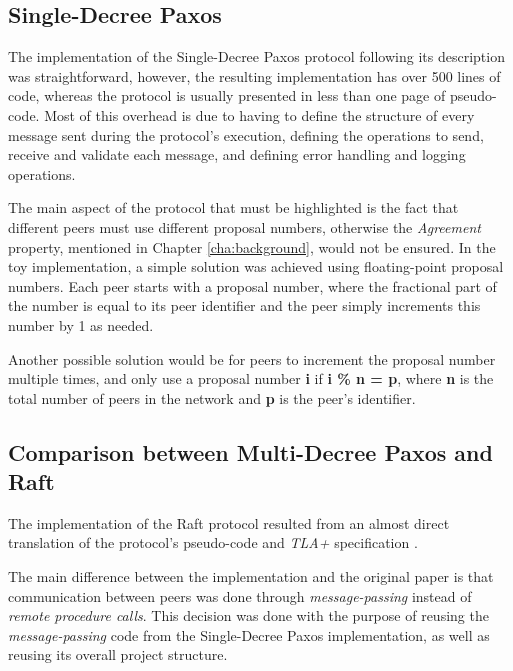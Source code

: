 \subsection{Single-Decree Paxos}

The implementation of the Single-Decree Paxos protocol following its description \cite{paxos_made_simple} was straightforward, however, the resulting implementation has over 500 lines of code, whereas the protocol is usually presented in less than one page of pseudo-code. Most of this overhead is due to having to define the structure of every message sent during the protocol's execution, defining the operations to send, receive and validate each message, and defining error handling and logging operations.

\vspace{0.2cm}

The main aspect of the protocol that must be highlighted is the fact that different peers must use different proposal numbers, otherwise the \textit{Agreement} property, mentioned in Chapter \ref{cha:background}, would not be ensured. In the toy implementation, a simple solution was achieved using floating-point proposal numbers. Each peer starts with a proposal number, where the fractional part of the number is equal to its peer identifier and the peer simply increments this number by 1 as needed.

Another possible solution would be for peers to increment the proposal number multiple times, and only use a proposal number \textbf{i} if \textbf{i \% n = p}, where \textbf{n} is the total number of peers in the network and \textbf{p} is the peer's identifier. 




\subsection{Comparison between Multi-Decree Paxos and Raft}

The implementation of the Raft protocol resulted from an almost direct translation of the protocol's pseudo-code \cite{raft} and \textit{TLA+} specification \cite{raft_tla}.

The main difference between the implementation and the original paper \cite{raft} is that communication between peers was done through \textit{message-passing} instead of \textit{remote procedure calls}. This decision was done with the purpose of reusing the \textit{message-passing} code from the Single-Decree Paxos implementation, as well as reusing its overall project structure.

